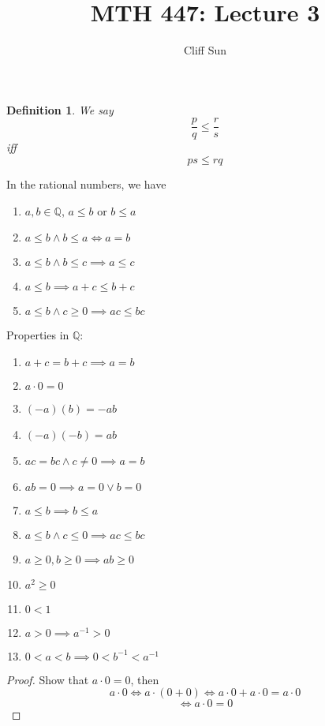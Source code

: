 \documentclass{article}
\title{MTH 447: Lecture 3}
\author{Cliff Sun}
\newtheorem{definition}[theorem]{Definition}
\newtheorem{one minute paper}[theorem]{One Minute Paper}
\begin{document}
\maketitle

\begin{definition}
    We say 
    \begin{equation}
        \frac{p}{q} \leq \frac{r}{s}
    \end{equation}
    iff 
    \begin{equation}
        ps \leq rq
    \end{equation}
\end{definition}

In the rational numbers, we have 
\begin{enumerate}
    \item $a,b \in \mathbb{Q}$, $a \leq b$ or $b \leq a$
    \item $a \leq b \land b \leq a \iff a = b$
    \item $a \leq b \land b \leq c \implies a \leq c$
    \item $a \leq b \implies a + c \leq b + c$
    \item $a \leq b \land c \geq 0 \implies ac \leq bc$
\end{enumerate}

Properties in $\mathbb{Q}$:
\begin{enumerate}
    \item $a + c = b + c \implies a = b$
    \item $a \cdot 0 = 0$
    \item $(-a)(b) = -ab$
    \item $(-a)(-b) = ab$
    \item $ac = bc \land c \neq 0 \implies a = b$
    \item $ab = 0 \implies a = 0 \lor b = 0$
    \item $a \leq b \implies b \leq a$
    \item $a \leq b \land c \leq 0 \implies ac \leq bc$
    \item $a \geq 0, b \geq 0 \implies ab \geq 0$
    \item $a^2 \geq 0$
    \item $0 < 1$
    \item $a > 0 \implies a^{-1} > 0$
    \item $0 < a < b \implies 0 < b^{-1} < a^{-1}$
\end{enumerate}

\begin{proof}
    Show that $a \cdot 0 = 0$, then 
    \begin{equation}
        a \cdot 0 \iff a \cdot (0 + 0) \iff a\cdot 0 + a\cdot 0 = a\cdot 0
    \end{equation}
    \begin{equation}
        \iff a \cdot 0 = 0
    \end{equation}
\end{proof}
\end{document}
